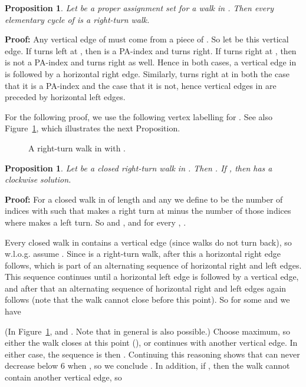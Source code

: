 \documentclass{llncs}
\newcommand{\PF}{{\bf Proof: }}
\newcommand{\QED}{\hspace*{\fill}{}\medskip}
\newtheorem{propo}[thm]{Proposition}
\begin{document}
\begin{propo}
\label{propo:elcyc_rightturn}
Let  be a proper assignment set for a walk  in . Then every elementary cycle  of  is a right-turn walk.
\end{propo}
\PF
Any vertical edge of  must come from a piece of . So let  be this vertical edge. If  turns left at , then  is a PA-index and  turns right. If  turns right at , then  is not a PA-index and  turns right as well. Hence in both cases, a vertical edge in  is followed by a horizontal right edge.
Similarly,  turns right at  in both the case that it is a PA-index and the case that it is not, hence vertical edges in  are preceded by horizontal left edges.
\QED

For the following proof, 
we use the following vertex labelling for . See also Figure~\ref{fig:rightturn}, which illustrates the next Proposition.




\begin{figure}
\centering
{}
\caption{A right-turn walk  in  with .}
\label{fig:rightturn}
\end{figure}

\begin{propo}
\label{propo:turnnum_closedrightturnwalk}
Let  be a closed right-turn walk in . Then . If , then  has a clockwise solution.
\end{propo}

\PF
For a closed walk  in  of length  and any  we define  to be the number of indices  with  such that  makes a right turn at  minus the number of those indices where  makes a left turn. So  and , and for every , .

Every closed walk in  contains a vertical edge (since walks do not turn back), so w.l.o.g. assume . Since  is a right-turn walk, after this a horizontal right edge follows, which is part of an alternating sequence of horizontal right and left edges. This sequence continues until a horizontal left edge is followed by a vertical edge, and after that an alternating sequence of horizontal right and left edges again follows (note that the walk cannot close before this point).
So for some  and  we have 

(In Figure~\ref{fig:rightturn},  and . Note that in general  is also possible.)
Choose  maximum, so either the walk  closes at this point (), or  continues with another vertical edge.
In either case, the sequence  is then .
Continuing this reasoning shows that  can never decrease below 6 when , so we conclude . In addition, if , then the walk cannot contain another vertical edge, so
\end{document}
